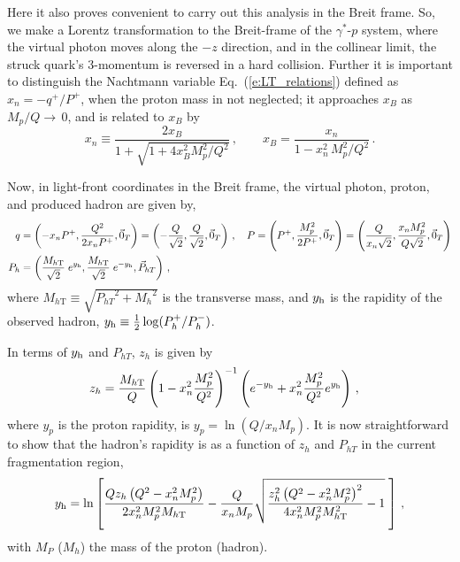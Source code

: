 \documentclass[final,3p,times,onecolumn,sort&compress,hidelinks]{elsarticle}
\newcommand{\xbj}{x_B}
\newcommand{\zh}{z_h}
\newcommand{\xn}{x_n}
\newcommand{\PhT}{\ensuremath{P_{hT}}}
\newcommand{\Tsc}[2]{#1_{#2\text{T}}}
\newcommand{\hady}{\ensuremath{y_{\rm h}}}
\newcommand{\hadpsc}{{\ensuremath{P_h}}}
\newcommand{\hadmass}{\ensuremath{M_h}}
\newcommand{\parz}[1]{\ensuremath{\left(#1\right)}}
\newcommand{\bea}{\begin{eqnarray}}
\newcommand{\eea}{\end{eqnarray}}
\begin{document}
 Here it also proves convenient to carry out this analysis in the Breit frame.
 So, we make a Lorentz transformation to  the Breit-frame of the  $\gamma^*$-$p$
 system, where the virtual photon moves along the $-z$ direction, and in the collinear limit, the struck quark's $3$-momentum is reversed in a hard collision.
  Further it is important to distinguish the Nachtmann variable Eq.~(\ref{e:LT_relations}) defined as $\xn=-q^+/P^+$, when the proton mass in not neglected; it approaches $\xbj$ as $M_p/Q\rightarrow\, 0$, and is related to $\xbj$ by
\begin{equation}
 \xn \equiv \frac{2 \xbj}{1 + \sqrt{1 + 4 \xbj^2 M_p^2/Q^2} }\,,
 \qquad 
 \xbj = \frac{\xn}{1 - \xn^2\,M_p^2/Q^2 }\, .
\label{eq:xn.xbj}
\end{equation}

Now, in light-front coordinates in the Breit frame, the virtual photon, proton, and produced hadron are given by,
\begin{align}
  q &{}= \parz{-\xn P^+,\frac{Q^2}{2 \xn P^+}, \vec{0}_{T} } = \parz{-\frac{Q}{\sqrt{2}},\frac{Q}{\sqrt{2}},\vec{0}_{T} }\, , \quad  P {}= \parz{P^+,\frac{M_p^2}{2 P^+},\vec{0}_{T} } = \parz{\frac{Q}{\xn \sqrt{2}},\frac{\xn M_p^2}{Q \sqrt{2} },\vec{0}_{T} }\\ \hadpsc &{}= \parz{\frac{\Tsc{M}{h}}{\sqrt{2}} \; e^{\hady},\frac{\Tsc{M}{h}}{\sqrt{2}} \; e^{-\hady},\vec{P}_{hT} }\, ,
  \label{eq:hadmom} 
\end{align}
where  $\Tsc{M}{h} \equiv \sqrt{ \PhT^2+ \hadmass^2 }$ is the transverse mass, and  $\hady$ is the
rapidity of the observed hadron, $\hady\equiv \frac{1}{2}\log(P_h^+/P_h^-)$.

In terms of $\hady$ and $\PhT$, $\zh$ is given by
\begin{align}
\zh  &=  
   \frac{\Tsc{M}{h}}{Q} \parz{1-\xn^2 \frac{M_p^2}{Q^2}}^{-1} \parz{ e^{-\hady}  +
   \xn^2 \frac{M_p^2}{Q^2}  e^{\hady} }
   \, , 
\label{eq:z}
\end{align}%
where $y_p$ is the proton rapidity, is $y_p =  \ln \parz{Q/\xn M_p}$. It is 
now straightforward to show that the hadron's rapidity is as a function of $\zh$ and $\PhT$ in the current fragmentation region,
\bea
\hady =   \ln \left[\frac{Q \zh \left(Q^2-\xn^2 M_p^2\right)}{2 \xn^2 M_p^2
   \Tsc{M}{h} } - \frac{Q}{\xn M_p} \sqrt{\frac{\zh^2 \left(Q^2-\xn^2 M_p^2\right)^2}{4 \xn^2 M_p^2
   \Tsc{M}{h} ^2}- 1} \; \right] \, , 
\label{eq:rapvalue}
\eea
with $M_P$ ($M_h$) the mass of the proton (hadron).
\end{document}
